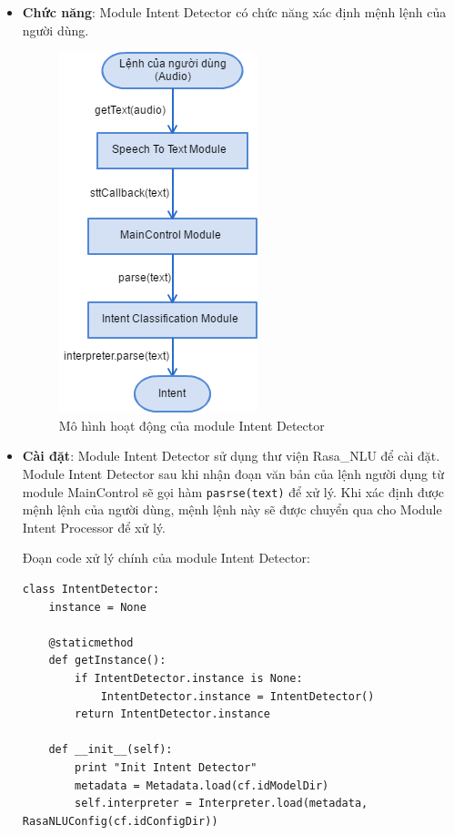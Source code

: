 \begin{itemize}
\item \textbf{Chức năng}: Module Intent Detector có chức năng xác định mệnh lệnh của người dùng.

\begin{figure}[h]
    \centering
    \includegraphics[scale=0.5]{intent_classification_flowchart}
    \caption{Mô hình hoạt động của module Intent Detector}
    \label{fig:c6_intent_classification_flowchart}
\end{figure}

\item \textbf{Cài đặt}: Module Intent Detector sử dụng thư viện Rasa\_NLU để cài đặt. Module Intent Detector sau khi nhận đoạn văn bản của lệnh người dụng từ module MainControl sẽ gọi hàm \lstinline{pasrse(text)} để xử lý. Khi xác định được mệnh lệnh của người dùng, mệnh lệnh này sẽ được chuyển qua cho Module Intent Processor để xử lý.

Đoạn code xử lý chính của module Intent Detector:
\begin{lstlisting}
class IntentDetector:
    instance = None

    @staticmethod
    def getInstance():
        if IntentDetector.instance is None:
            IntentDetector.instance = IntentDetector()
        return IntentDetector.instance

    def __init__(self):
        print "Init Intent Detector"
        metadata = Metadata.load(cf.idModelDir)
        self.interpreter = Interpreter.load(metadata, RasaNLUConfig(cf.idConfigDir))


\end{lstlisting}
\end{itemize}
